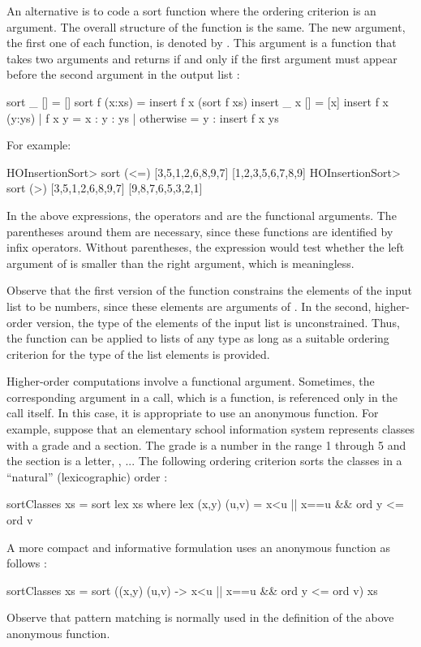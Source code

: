 An alternative is to code a sort function where the ordering
criterion is an argument.
The overall structure of the function is the same.
The new argument, the first one of each function,
is denoted by .
This argument is a function that takes two arguments
and returns  if and only if the first argument
must appear before the second argument in the output list
:
%
\begin{prog}
\label{HOInsertionSort}
sort _ []     = []
sort f (x:xs) = insert f x (sort f xs)
\medskip
insert _ x [] = [x]
insert f x (y:ys) | f x y     = x : y : ys
                  | otherwise = y : insert f x ys
\end{prog}
%
For example:
%
\begin{prog}
HOInsertionSort> sort (<=) [3,5,1,2,6,8,9,7]
[1,2,3,5,6,7,8,9]
HOInsertionSort> sort (>) [3,5,1,2,6,8,9,7]
[9,8,7,6,5,3,2,1]
\end{prog}
%
In the above expressions, 
the operators \ccode{<=} and \ccode{>} are the functional arguments.
The parentheses around them are necessary, since these
functions are identified by infix operators.
Without parentheses, the expression 
would test whether the left argument of \ccode{<=}
is smaller than the right argument, which is meaningless.

Observe that the first version of the  function constrains
the elements of the input list to be numbers,
since these elements are arguments of \ccode{<=}.
In the second, higher-order version, the type 
of the elements of the input list is unconstrained.
Thus, the function can be applied to lists of any type
as long as a suitable ordering criterion
for the type of the list elements is provided.

Higher-order computations involve a functional argument.
Sometimes, the corresponding argument in a call, which is
a function, is referenced only in the call itself.
In this case, it is appropriate to use an anonymous
function.
For example, suppose that an elementary school information
system represents classes with a grade and a section.
The grade is a number in the range 1 through 5 and the
section is a letter, ,  ...
The following ordering criterion sorts the classes
in a  ``natural'' (lexicographic) order
:
%
\begin{prog}
sortClasses xs = sort lex xs
   where lex (x,y) (u,v) = x<u || x==u \&\& ord y <= ord v 
\end{prog}
%
A more compact and informative formulation uses
an anonymous function as follows
:
%
\begin{prog}
sortClasses xs = sort ((x,y) (u,v) -> x<u || x==u \&\& ord y <= ord v) xs
\end{prog}
%
Observe that pattern matching is normally used in the definition
of the above anonymous function.

